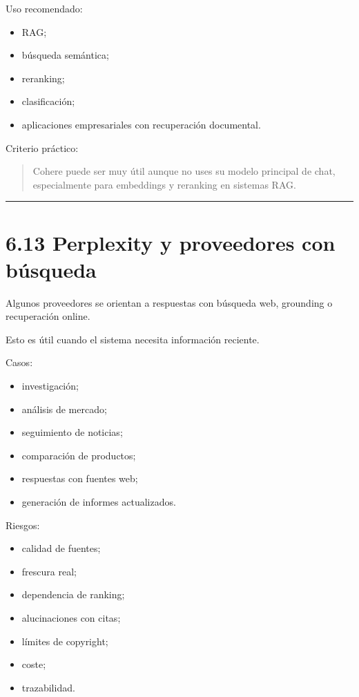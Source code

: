 Uso recomendado:

\begin{itemize}
\tightlist
\item
  RAG;
\item
  búsqueda semántica;
\item
  reranking;
\item
  clasificación;
\item
  aplicaciones empresariales con recuperación documental.
\end{itemize}

Criterio práctico:

\begin{quote}
Cohere puede ser muy útil aunque no uses su modelo principal de chat,
especialmente para embeddings y reranking en sistemas RAG.
\end{quote}

\begin{center}\rule{0.5\linewidth}{0.5pt}\end{center}

\section{6.13 Perplexity y proveedores con
búsqueda}\label{perplexity-y-proveedores-con-buxfasqueda}

Algunos proveedores se orientan a respuestas con búsqueda web, grounding
o recuperación online.

Esto es útil cuando el sistema necesita información reciente.

Casos:

\begin{itemize}
\tightlist
\item
  investigación;
\item
  análisis de mercado;
\item
  seguimiento de noticias;
\item
  comparación de productos;
\item
  respuestas con fuentes web;
\item
  generación de informes actualizados.
\end{itemize}

Riesgos:

\begin{itemize}
\tightlist
\item
  calidad de fuentes;
\item
  frescura real;
\item
  dependencia de ranking;
\item
  alucinaciones con citas;
\item
  límites de copyright;
\item
  coste;
\item
  trazabilidad.
\end{itemize}

